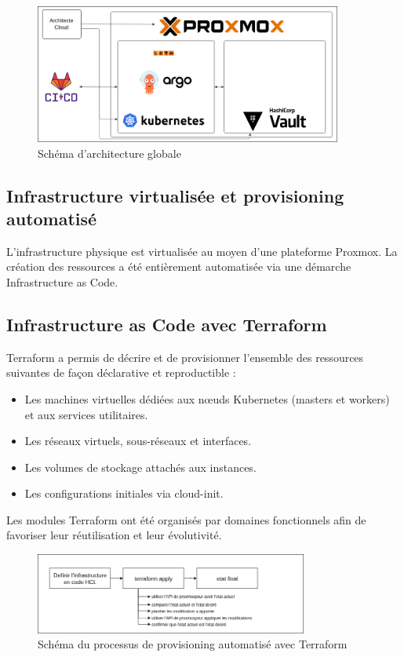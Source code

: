 \begin{figure}[H]
	\centering
	\includegraphics[width=0.9\textwidth]{figures/architecture-globale.png}
	\caption{Schéma d'architecture globale}
\end{figure}

\subsection{Infrastructure virtualisée et provisioning automatisé}

L'infrastructure physique est virtualisée au moyen d'une plateforme Proxmox. La création des ressources a été entièrement automatisée via une démarche Infrastructure as Code.

\subsection*{Infrastructure as Code avec Terraform}

Terraform a permis de décrire et de provisionner l'ensemble des ressources suivantes de façon déclarative et reproductible :
\begin{itemize}
	\item Les machines virtuelles dédiées aux nœuds Kubernetes (masters et workers) et aux services utilitaires.
	\item Les réseaux virtuels, sous-réseaux et interfaces.
	\item Les volumes de stockage attachés aux instances.
	\item Les configurations initiales via cloud-init.
\end{itemize}

Les modules Terraform ont été organisés par domaines fonctionnels afin de favoriser leur réutilisation et leur évolutivité.

\begin{figure}[H]
	\centering
	\includegraphics[width=0.8\textwidth]{figures/terraform-provisioning.png}
	\caption{Schéma du processus de provisioning automatisé avec Terraform}
\end{figure}

